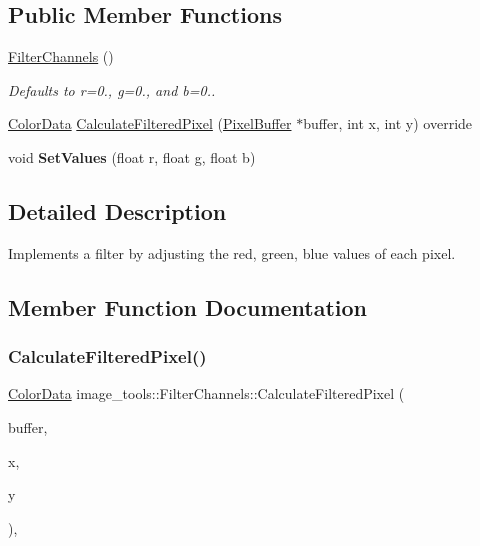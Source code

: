 \subsection*{Public Member Functions}
\begin{DoxyCompactItemize}
\item 
\mbox{\label{classimage__tools_1_1FilterChannels_aabe05d8cef0727cd96baa22d18b2e50e}} 
\hyperlink{classimage__tools_1_1FilterChannels_aabe05d8cef0727cd96baa22d18b2e50e}{Filter\+Channels} ()
\begin{DoxyCompactList}\small\item\em Defaults to r=0., g=0., and b=0.. \end{DoxyCompactList}\item 
\hyperlink{classimage__tools_1_1ColorData}{Color\+Data} \hyperlink{classimage__tools_1_1FilterChannels_a99af7bdf46f4d606fae4baa793025836}{Calculate\+Filtered\+Pixel} (\hyperlink{classimage__tools_1_1PixelBuffer}{Pixel\+Buffer} $\ast$buffer, int x, int y) override
\item 
\mbox{\label{classimage__tools_1_1FilterChannels_a2c48ab1acde424eee37af26745f9ce29}} 
void {\bfseries Set\+Values} (float r, float g, float b)
\end{DoxyCompactItemize}


\subsection{Detailed Description}
Implements a filter by adjusting the red, green, blue values of each pixel. 

\subsection{Member Function Documentation}
\mbox{\label{classimage__tools_1_1FilterChannels_a99af7bdf46f4d606fae4baa793025836}} 
\subsubsection{\texorpdfstring{Calculate\+Filtered\+Pixel()}{CalculateFilteredPixel()}}
{\footnotesize\ttfamily \hyperlink{classimage__tools_1_1ColorData}{Color\+Data} image\+\_\+tools\+::\+Filter\+Channels\+::\+Calculate\+Filtered\+Pixel (\begin{DoxyParamCaption}\item[{\hyperlink{classimage__tools_1_1PixelBuffer}{Pixel\+Buffer} $\ast$}]{buffer,  }\item[{int}]{x,  }\item[{int}]{y }\end{DoxyParamCaption})\hspace{0.3cm}{\ttfamily [override]}, {\ttfamily [virtual]}}

